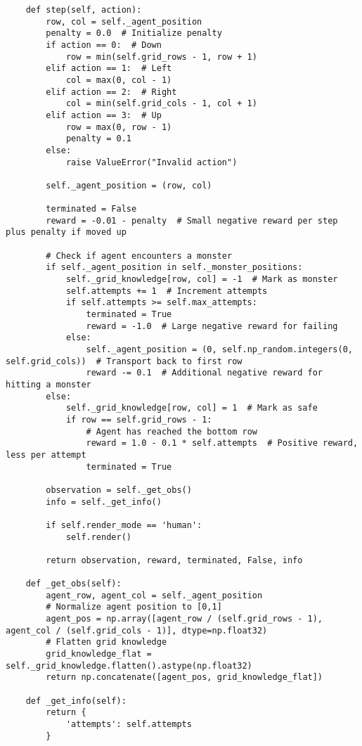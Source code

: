 \begin{lstlisting}
    def step(self, action):
        row, col = self._agent_position
        penalty = 0.0  # Initialize penalty
        if action == 0:  # Down
            row = min(self.grid_rows - 1, row + 1)
        elif action == 1:  # Left
            col = max(0, col - 1)
        elif action == 2:  # Right
            col = min(self.grid_cols - 1, col + 1)
        elif action == 3:  # Up
            row = max(0, row - 1)
            penalty = 0.1
        else:
            raise ValueError("Invalid action")

        self._agent_position = (row, col)

        terminated = False
        reward = -0.01 - penalty  # Small negative reward per step plus penalty if moved up

        # Check if agent encounters a monster
        if self._agent_position in self._monster_positions:
            self._grid_knowledge[row, col] = -1  # Mark as monster
            self.attempts += 1  # Increment attempts
            if self.attempts >= self.max_attempts:
                terminated = True
                reward = -1.0  # Large negative reward for failing
            else:
                self._agent_position = (0, self.np_random.integers(0, self.grid_cols))  # Transport back to first row
                reward -= 0.1  # Additional negative reward for hitting a monster
        else:
            self._grid_knowledge[row, col] = 1  # Mark as safe
            if row == self.grid_rows - 1:
                # Agent has reached the bottom row
                reward = 1.0 - 0.1 * self.attempts  # Positive reward, less per attempt
                terminated = True

        observation = self._get_obs()
        info = self._get_info()

        if self.render_mode == 'human':
            self.render()

        return observation, reward, terminated, False, info

    def _get_obs(self):
        agent_row, agent_col = self._agent_position
        # Normalize agent position to [0,1]
        agent_pos = np.array([agent_row / (self.grid_rows - 1), agent_col / (self.grid_cols - 1)], dtype=np.float32)
        # Flatten grid knowledge
        grid_knowledge_flat = self._grid_knowledge.flatten().astype(np.float32)
        return np.concatenate([agent_pos, grid_knowledge_flat])

    def _get_info(self):
        return {
            'attempts': self.attempts
        }


\end{lstlisting}
